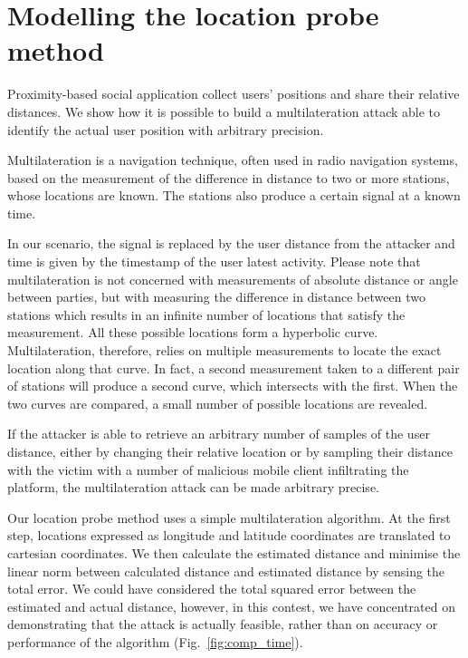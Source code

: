 \section{Modelling the location probe method}
\label{sec:loc-probe}
\noindent
Proximity-based social application collect users' positions and share their relative distances. We show how it is possible to build a multilateration attack able to identify the actual user position with arbitrary precision.

Multilateration is a navigation technique, often used in radio navigation systems, based on the measurement of the difference in distance to two or more stations, whose locations are known. The stations also produce a certain signal at a known time.\

In our scenario, the signal is replaced by the user distance from the attacker and time is given by the timestamp of the user latest activity. Please note that multilateration is not concerned with measurements of absolute distance or angle between parties, but with measuring the difference in distance between two stations which results in an infinite number of locations that satisfy the measurement. All these possible locations form a hyperbolic curve. Multilateration, therefore, relies on multiple measurements to locate the exact location along that curve. In fact, a second measurement taken to a different pair of stations will produce a second curve, which intersects with the first. When the two curves are compared, a small number of possible locations are revealed.

If the attacker is able to retrieve an arbitrary number of samples of the user distance, either by changing their relative location or by sampling their distance with the victim with a number of malicious mobile client infiltrating the platform, the multilateration attack can be made arbitrary precise.

Our location probe method uses a simple multilateration algorithm. At the first step, locations expressed as longitude and latitude coordinates are translated to cartesian coordinates. We then calculate the estimated distance and minimise the linear norm between calculated distance and estimated distance by sensing the total error. We could have considered the total squared error between the estimated and actual distance, however, in this contest, we have concentrated on demonstrating that the attack is actually feasible, rather than on accuracy or performance of the algorithm (Fig.~\ref{fig:comp_time}).

